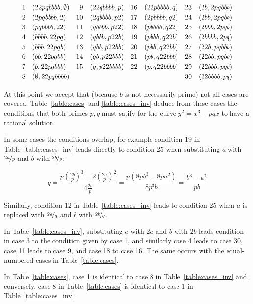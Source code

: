 \documentclass[12pt]{amsart}
\theoremstyle{definition}
\begin{document}
	\[
	{\renewcommand{\arraystretch}{1.2}
		\begin{array}{rlrlrlrl}
			1&(22pqbbbb,\emptyset)&9&(22qbbbb,p)&16&(22pbbbb,q)&23&(2b,2pqbbb)\\
			2&(2pqbbbb,2)&10&(2qbbbb,p2)&17&(2pbbbb,q2)&24&(2bb,2pqbb)\\
			3&(pqbbbb,22)&11&(qbbbb,p22)&18&(pbbbb,q22)&25&(2bbb,2pqb)\\
			4&(bbbb,22pq)&12&(qbbb,p22b)&19&(pbbb,q22b)&26&(2bbbb,2pq)\\
			5&(bbb,22pqb)&13&(qbb,p22bb)&20&(pbb,q22bb)&27&(22b,pqbbb)\\
			6&(bb,22pqbb)&14&(qb,p22bbb)&21&(pb,q22bbb)&28&(22bb,pqbb)\\
			7&(b,22pqbbb)&15&(q,p22bbbb)&22&(p,q22bbbb)&29&(22bbb,pqb)\\
			8&(\emptyset,22pqbbbb)&&&&&30&(22bbbb,pq)
	\end{array}}
	\]
	
	\par\medskip
	At this point we accept that (because $b$ is not necessarily prime) not all cases are covered. Table~\ref{table:cases} and \ref{table:cases_inv} deduce from these cases the conditions that both primes $p,q$ must satify for the curve $y^2=x^3-pqx$ to have a rational solution.
	
	In some cases the conditions overlap, for example condition 19 in Table~\ref{table:cases_inv} leads directly to condition 25 when substituting $a$ with $\nicefrac{2a}{p}$ and $b$ with $\nicefrac{2b}{p}$:
	
	\[
	q=\frac{p\left(\frac{2b}{p}\right)^3-2\left(\frac{2a}{p}\right)^2}{4\frac{2b}{p}}=\frac{p(8pb^3-8pa^2)}{8p^3b}=\frac{b^3-a^2}{pb}
	\]
	
	\par\medskip
	Similarly, condition 12 in Table~\ref{table:cases_inv} leads to condition 25 when $a$ is replaced with $\nicefrac{2a}{q}$ and $b$ with $\nicefrac{2b}{q}$.
	
	In Table~\ref{table:cases_inv}, substituting $a$ with $2a$ and $b$ with $2b$ leads condition in case 3 to the condition given by case 1, and similarly case 4 leads to case 30, case 11 leads to case 9, and case 18 to case 16. The same occurs with the equal-numbered cases in Table~\ref{table:cases}.
	
	In Table~\ref{table:cases}, case 1 is identical to case 8 in Table~\ref{table:cases_inv} and, conversely, case 8 in Table~\ref{table:cases} is identical to case 1 in Table~\ref{table:cases_inv}.
	
\end{document}
